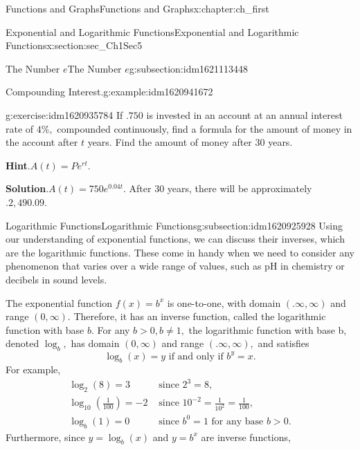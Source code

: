 \documentclass[oneside,10pt,]{book}
\newcommand{\blocktitlefont}{\relax}
\numberwithin{equation}{section}
\newcommand{\gt}{>}
\newcommand{\amp}{&}
\begin{document}
\begin{chapterptx}{Functions and Graphs}{}{Functions and Graphs}{}{}{x:chapter:ch_first}
\begin{sectionptx}{Exponential and Logarithmic Functions}{}{Exponential and Logarithmic Functions}{}{}{x:section:sec_Ch1Sec5}
\begin{subsectionptx}{The Number \(e \)}{}{The Number \(e \)}{}{}{g:subsection:idm1621113448}
\begin{example}{Compounding Interest.}{g:example:idm1620941672}
\begin{enumerate}
%
\end{enumerate}
\end{example}
\begin{inlineexercise}{}{g:exercise:idm1620935784}%
If \(.750\) is invested in an account at an annual interest rate of \(4\%,\) compounded continuously, find a formula for the amount of money in the account after \(t\) years. Find the amount of money after \(30\) years.%
\par\smallskip%
\noindent\textbf{\blocktitlefont Hint}.\hypertarget{g:hint:idm1620929256}{}\quad{}\(A(t)=Pe^{rt}.\)%
\par\smallskip%
\noindent\textbf{\blocktitlefont Solution}.\hypertarget{g:solution:idm1620932584}{}\quad{}\(A(t)=750e^{0.04t}.\) After \(30\) years, there will be approximately \(.2,490.09.\)%
\end{inlineexercise}%
\end{subsectionptx}
%
%
\typeout{************************************************}
\typeout{************************************************}
%
\begin{subsectionptx}{Logarithmic Functions}{}{Logarithmic Functions}{}{}{g:subsection:idm1620925928}
Using our understanding of exponential functions, we can discuss their inverses, which are the logarithmic functions. These come in handy when we need to consider any phenomenon that varies over a wide range of values, such as pH in chemistry or decibels in sound levels.%
\par
The exponential function \(f(x)=b^x\) is one-to-one, with domain \((.\infty,\infty)\) and range \((0,\infty).\) Therefore, it has an inverse function, called the logarithmic function with base \(b.\) For any \(b\gt 0,b\neq 1,\) the logarithmic function with base b, denoted \(\log_b ,\) has domain \((0,\infty)\) and range \((.\infty,\infty),\) and satisfies%
%
\begin{equation*}
\log_b (x)=y \text{ if and only if } b^y=x.
\end{equation*}
For example,%
%
\begin{align*}
\log_2 (8)=3 \amp \text{ since } 2^3=8,\\
\log_{10}( \frac{1}{100})=-2 \amp \text{ since } 10^{-2}= \frac{1}{10^2}= \frac{1}{100},\\
\log_b (1)=0 \amp \text{ since } b^0=1 \text{ for any base } b\gt 0.
\end{align*}
Furthermore, since \(y=\log_b (x)\) and \(y=b^x\) are inverse functions,%
%
\begin{equation*}

\end{equation*}
\end{subsectionptx}
\end{sectionptx}
\end{chapterptx}
\end{document}
